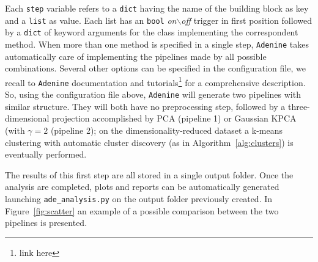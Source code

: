 \documentclass[twoside,11pt]{article}
\makeatletter
\newcommand{\ade}{\texttt{Adenine}\@\xspace}
\makeatother
\begin{document}
\noindent Each \texttt{step} variable refers to a \texttt{dict} having the name of the building block as key and a \texttt{list} as value. Each list has an \texttt{bool} \emph{on$\backslash$off} trigger in first position followed by a \texttt{dict} of keyword arguments for the class implementing the correspondent method. When more than one method is specified in a single step, \ade takes automatically care of implementing the pipelines made by all possible combinations. Several other options can be specified in the configuration file, we recall to \ade documentation and tutorials\footnote{link here} for a comprehensive description. So, using the configuration file above, \ade will generate two pipelines with similar structure. They will both have no preprocessing step, followed by a three-dimensional projection accomplished by PCA (pipeline 1) or Gaussian KPCA (with $\gamma=2$ (pipeline 2); on the dimensionality-reduced dataset a k-means clustering with automatic cluster discovery (as in Algorithm~\ref{alg:clusters}) is eventually performed.

The results of this first step are all stored in a single output folder. Once the analysis are completed, plots and reports can be automatically generated launching \texttt{ade\_analysis.py} on the output folder previously created. In Figure~\ref{fig:scatter} an example of a possible comparison between the two pipelines is presented.
\end{document}
